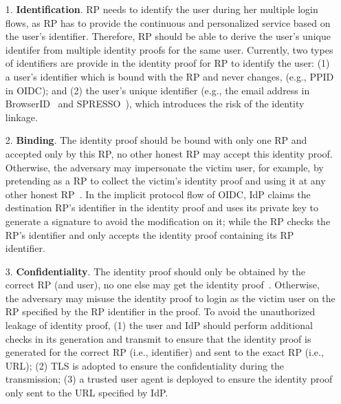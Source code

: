 \begin{itemize}
\item[1.] \textbf{Identification}. %
RP needs to identify the user during her multiple login flows, 
as RP has to provide the continuous and personalized service based on the user's identifier. 
Therefore, RP should be able to derive the user's  unique identifer from multiple identity proofs for the same user.
Currently, two types of identifiers are provide in the identity proof for RP to identify the user: (1) a user's identifier which is bound with the RP and never changes, (e.g., PPID in OIDC); and (2) the user's unique identifier (e.g., the email address in BrowserID~\cite{BrowserID} and SPRESSO~\cite{SPRESSO}), which introduces the risk of the identity linkage. 

\item[2.] \textbf{Binding}. The identity proof should be bound with only one RP and accepted only by this RP, no other honest RP may accept this identity proof. 
Otherwise, the adversary may impersonate the victim user, 
for example, by pretending as a RP to collect the victim's identity proof and using it at any other honest RP~\cite{ChenPCTKT14, WangZLG16}.
 In the implicit protocol flow of OIDC, IdP claims the destination RP's identifier in the identity proof and uses its private key to generate a signature to  avoid the modification on it;
 while the RP checks the RP's identifier and only accepts the identity proof containing its RP identifier.
 
\item[3.] \textbf{Confidentiality}. The identity proof should only be obtained by the correct RP (and user), no one else may get the identity proof~\cite{ChenPCTKT14,FettKS16,WangZLG16}.
 Otherwise, the adversary may misuse the identity proof to login as the victim user on the RP specified by the RP identifier in the proof. 
 To avoid the unauthorized leakage of identity proof, 
 (1) the  user and IdP should perform additional checks  in its generation and transmit to ensure that the identity proof is generated for the correct RP (i.e., identifier) and sent to the exact RP (i.e., URL); 
 (2) TLS is adopted to ensure the confidentiality during the transmission; 
 (3) a trusted user agent is deployed to ensure the identity proof only sent to the URL specified by  IdP.
 

\end{itemize}
